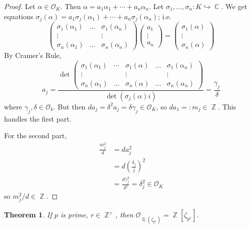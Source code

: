 \documentclass[11pt, a4paper]{memoir}
\DeclareMathOperator{\Q}{{\mathbb{Q}}}
\DeclareMathOperator{\Z}{{\mathbb{Z}}}
\DeclareMathOperator{\C}{{\mathbb{C}}}
\theoremstyle{change}
\newtheorem{theorem}{Theorem}[section]
\theoremstyle{plain}
\theoremstyle{nonumberplain}
\newtheorem{proof}{Proof}
\begin{document}
\begin{proof}
    Let $\alpha\in\mathcal{O}_K$.
    Then $\alpha=a_1\alpha_1+\cdots+a_n\alpha_n$.
    Let $\sigma_1,\ldots,\sigma_n:K\hookrightarrow\C$.
    We get equations $\sigma_j(\alpha)=a_1\sigma_j(\alpha_1)+\cdots+a_n\sigma_j(\alpha_n)$; i.e.
    \begin{equation*}
        \begin{pmatrix}
            \sigma_1(\alpha_1)&\hdots&\sigma_1(\alpha_n)\\
            \vdots&&\vdots\\
            \sigma_n(\alpha_1)&\hdots&\sigma_n(\alpha_n)
        \end{pmatrix}
        \begin{pmatrix}
            a_1\\\vdots\\a_n
        \end{pmatrix}
        =
        \begin{pmatrix}
            \sigma_1(\alpha)\\\vdots\\\sigma_n(\alpha)
        \end{pmatrix}
    \end{equation*}
    By Cramer's Rule,
    \begin{equation*}
        a_j=\frac{\det\begin{pmatrix}\sigma_1(\alpha_1)&\cdots&\sigma_1(\alpha)&\hdots&\sigma_1(\alpha_n)\\\vdots&&\vdots&&\vdots\\\sigma_n(\alpha_1)&\hdots&\sigma_n(\alpha)&\hdots&\sigma_n(\alpha_n)\end{pmatrix}}{\det(\sigma_j(\alpha)i)}=\frac{\gamma_j}{\delta}
    \end{equation*}
    where $\gamma_j,\delta\in\mathcal{O}_k$.
    But then $da_j=\delta^2a_j=\delta\gamma_j\in\mathcal{O}_K$, so $da_1=:m_j\in\Z$.
    This handles the first part.

    For the second part,
    \begin{align*}
        \frac{m_j^2}{d} &= da_j^2\\
                        &=d\left(\frac{\delta_j}{j}\right)^2\\
                        &= \frac{d\gamma_j^2}{\delta^2}=\delta_j^2\in\mathcal{O}_K
    \end{align*}
    so $m_j^2/d\in\Z$.
\end{proof}
\begin{theorem}
    If $p$ is prime, $r\in\Z^+$, then $\mathcal{O}_{\Q(\zeta_{p^r})}=\Z[\zeta_{p^r}]$.
\end{theorem}
\end{document}
